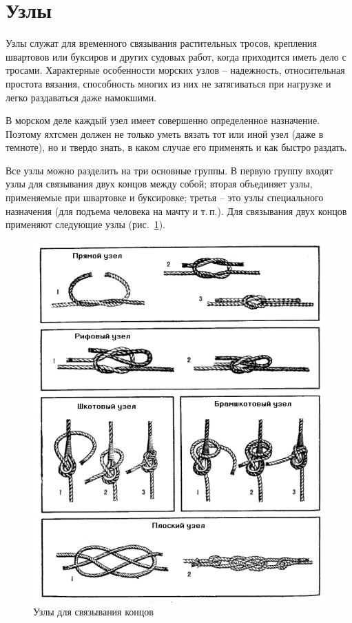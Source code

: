 \documentclass[a4paper, 12pt, twoside, final]{scrbook}
\begin{document}
\section{Узлы}

Узлы служат для временного связывания растительных тросов, крепления швартовов или буксиров и других судовых работ, когда приходится иметь дело с тросами. Характерные особенности морских узлов \--- надежность, относительная простота вязания, способность многих из них не затягиваться при нагрузке и легко раздаваться даже намокшими.

В морском деле каждый узел имеет совершенно определенное назначение. Поэтому яхтсмен должен не только уметь вязать тот или иной узел (даже в темноте), но и твердо знать, в каком случае его применять и как быстро раздать.

Все узлы можно разделить на три основные группы. В первую группу входят узлы для связывания двух концов между собой; вторая объединяет узлы, применяемые при швартовке и буксировке; третья \--- это узлы специального назначения (для подъема человека на мачту и т.\,п.). Для связывания двух концов применяют следующие узлы (рис.~\ref{fig:59}).

\begin{figure}[htbp]
   \centering
   \includegraphics{59_Uzly} %
   \caption{Узлы для связывания концов}
   \label{fig:59}
\end{figure}
\end{document}

